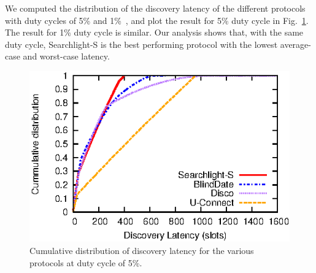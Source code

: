\documentclass[twoside,twocolumn]{article}
\begin{document}
We computed the distribution of the discovery latency of the different
protocols with duty cycles of 5\% and
1\%~\citep{wang13blinddate, sun14hello, bakht2012searchlight}, and plot
the result for 5\% duty cycle in Fig.~\ref{fig:latency-cdf}. The
result for 1\% duty cycle is similar. Our analysis shows that, with
the same duty cycle, Searchlight-S is the best performing protocol
with the lowest average-case and worst-case latency.

\begin{figure}[t]
   \centering
   \includegraphics{graphs/analysis/latency-cdf}
   \caption{Cumulative distribution of discovery latency for the
		          various protocols at duty cycle of 5\%.}
   \label{fig:latency-cdf}
\end{figure}
\end{document}
